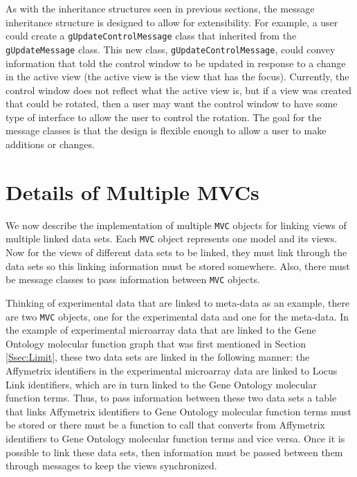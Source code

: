 \documentclass{article}[11pt]
\newcommand{\Robject}[1]{{\texttt{#1}}}
\newcommand{\Rclass}[1]{\texttt{#1}}
\begin{document}
As with the inheritance structures seen in previous sections, the message
inheritance structure is designed to allow for extensibility.  For example, a
user could create a \Rclass{gUpdateControlMessage} class that inherited from
the \Rclass{gUpdateMessage} class.  This new class,
\Rclass{gUpdateControlMessage}, could convey information that told the
control window to be updated in response to a change in the active view (the
active view is the view that has the focus).  Currently, the control window
does not reflect what the active view is, but if a view was created that could
be rotated, then a user may want the control window to have some type of
interface to allow the user to control the rotation.  The goal for the message
classes is that the design is flexible enough to allow a user to make
additions or changes. 

\section{Details of Multiple MVCs}\label{Sec:MultMVC}

We now describe the implementation of multiple \Robject{MVC} objects for
linking views of multiple linked data sets.  Each \Robject{MVC} object
represents one model and its views.  Now for the
views of different data sets to be linked, they must link through
the data sets so this linking information must be stored somewhere.  Also,
there must be message classes to pass information between
\Robject{MVC} objects. 

Thinking of experimental data that are linked to meta-data as an example, there
are two \Robject{MVC} objects, one for the experimental data and one for the
meta-data.  In the example of experimental microarray data that are linked to
the Gene Ontology molecular function graph that was first mentioned in Section
\ref{Ssec:Limit}, these two data sets are linked in the following manner: the
Affymetrix identifiers in the experimental microarray data are linked to Locus
Link identifiers, which are in turn linked to the Gene Ontology molecular
function terms.  Thus, to pass information between these two data sets a table
that links Affymetrix identifiers to Gene Ontology molecular function terms
must be stored or there must be a function to call that converts from
Affymetrix identifiers to Gene Ontology molecular function terms and vice
versa.  Once it is possible to link these data sets, then information must be
passed between them through messages to keep the views synchronized.
\end{document}
